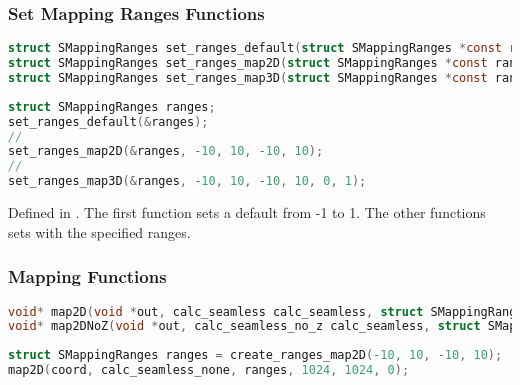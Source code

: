 \subsubsection{Set Mapping Ranges Functions}

\begin{lstlisting}[caption={Definition of set ranges functions},label={lst:set_ranges_definition},language=OpenCL]
struct SMappingRanges set_ranges_default(struct SMappingRanges *const ranges);
struct SMappingRanges set_ranges_map2D(struct SMappingRanges *const ranges, REAL x0, REAL x1, REAL y0, REAL y1);
struct SMappingRanges set_ranges_map3D(struct SMappingRanges *const ranges, REAL x0, REAL x1, REAL y0, REAL y1, REAL z0, REAL z1);
\end{lstlisting}

\begin{lstlisting}[caption={Example for set ranges functions},label={lst:set_ranges_example},language=OpenCL]
struct SMappingRanges ranges;
set_ranges_default(&ranges);
//
set_ranges_map2D(&ranges, -10, 10, -10, 10);
//
set_ranges_map3D(&ranges, -10, 10, -10, 10, 0, 1);
\end{lstlisting}

Defined in .
The first function sets a default  from -1 to 1.
The other functions sets  with the specified ranges.

\subsubsection{Mapping Functions}

\begin{lstlisting}[caption={Definition of mapping functions},label={lst:mapping_definition},language=OpenCL]
void* map2D(void *out, calc_seamless calc_seamless, struct SMappingRanges ranges, size_t width, size_t height, REAL z);
void* map2DNoZ(void *out, calc_seamless_no_z calc_seamless, struct SMappingRanges ranges, size_t width, size_t height);
\end{lstlisting}

\begin{lstlisting}[caption={Example for mapping functions},label={lst:mapping_example},language=OpenCL]
struct SMappingRanges ranges = create_ranges_map2D(-10, 10, -10, 10);
map2D(coord, calc_seamless_none, ranges, 1024, 1024, 0);
\end{lstlisting}

